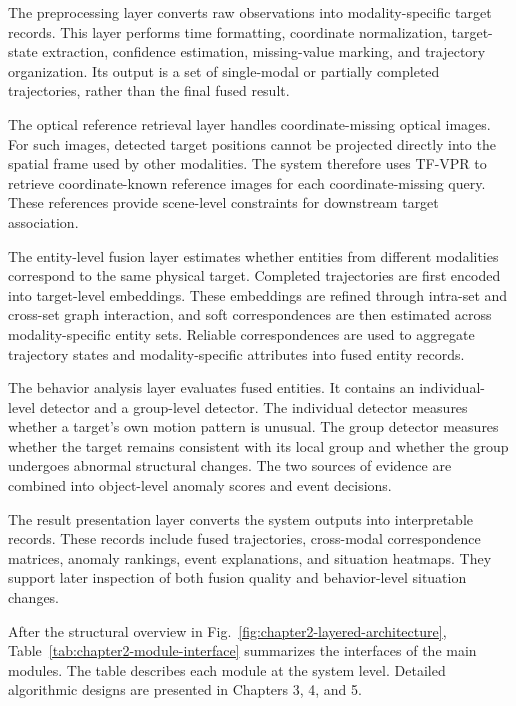 The preprocessing layer converts raw observations into modality-specific target records. This layer performs time formatting, coordinate normalization, target-state extraction, confidence estimation, missing-value marking, and trajectory organization. Its output is a set of single-modal or partially completed trajectories, rather than the final fused result.

The optical reference retrieval layer handles coordinate-missing optical images. For such images, detected target positions cannot be projected directly into the spatial frame used by other modalities. The system therefore uses TF-VPR to retrieve coordinate-known reference images for each coordinate-missing query. These references provide scene-level constraints for downstream target association.

The entity-level fusion layer estimates whether entities from different modalities correspond to the same physical target. Completed trajectories are first encoded into target-level embeddings. These embeddings are refined through intra-set and cross-set graph interaction, and soft correspondences are then estimated across modality-specific entity sets. Reliable correspondences are used to aggregate trajectory states and modality-specific attributes into fused entity records.

The behavior analysis layer evaluates fused entities. It contains an individual-level detector and a group-level detector. The individual detector measures whether a target's own motion pattern is unusual. The group detector measures whether the target remains consistent with its local group and whether the group undergoes abnormal structural changes. The two sources of evidence are combined into object-level anomaly scores and event decisions.

The result presentation layer converts the system outputs into interpretable records. These records include fused trajectories, cross-modal correspondence matrices, anomaly rankings, event explanations, and situation heatmaps. They support later inspection of both fusion quality and behavior-level situation changes.

After the structural overview in Fig.~\ref{fig:chapter2-layered-architecture}, Table~\ref{tab:chapter2-module-interface} summarizes the interfaces of the main modules. The table describes each module at the system level. Detailed algorithmic designs are presented in Chapters 3, 4, and 5.

